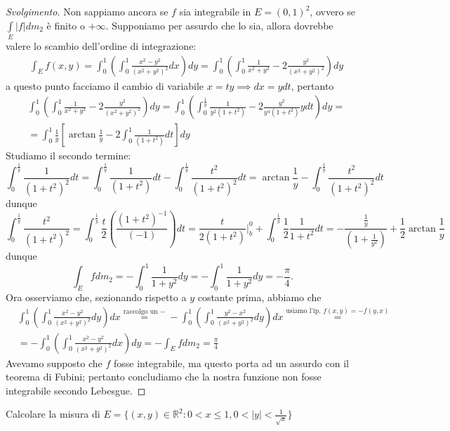 \begin{proof}[Svolgimento]
	Non sappiamo ancora se $f$ sia integrabile in $E = (0,1)^2$, ovvero se $\int\limits_E |f|dm_2$ è finito o $+\infty$. Supponiamo per assurdo che lo sia, allora dovrebbe valere lo scambio dell'ordine di integrazione:
	\begin{align*}
	&\int_E f(x, y) = \int_0^1 \left( \int_0^1 \frac{x^2 - y^2}{(x^2 + y^2)^2} dx \right) dy = \int_0^1 \left( \int_0^1 \frac{1}{x^2+y^2} - 2\frac{y^2}{(x^2 + y^2)^2} \right) dy
	\end{align*}
	a questo punto facciamo il cambio di variabile $x = ty \implies dx = ydt$, pertanto
	\begin{align*}
	&\int_0^1 \left( \int_0^1 \frac{1}{x^2+y^2} - 2\frac{y^2}{(x^2 + y^2)^2} \right) dy = \int_0^1 \left( \int_0^{\frac{1}{y}} \frac{1}{y^2(1+t^2)} - 2\frac{y^2}{y^4(1+t^2)} ydt \right)dy = \\
	&=\int_0^1 \frac{1}{y} \left[ \arctan{\frac{1}{y}} - 2 \int_0^1 \frac{1}{(1+t^2)}dt \right]dy
	\end{align*}
	Studiamo il secondo termine:
	$$
	\int_0^{\frac{1}{y}} \frac{1}{(1+t^2)^2} dt = \int_0^{\frac{1}{y}} \frac{1}{(1+t^2)}dt - \int_0^{\frac{1}{y}} \frac{t^2}{(1+t^2)^2} dt = \arctan{\frac{1}{y}} - \int_0^{\frac{1}{y}} \frac{t^2}{(1+t^2)^2}dt
	$$
	dunque
	$$
	\int_0^{\frac{1}{y}} \frac{t^2}{(1+t^2)^2} = \int_0^{\frac{1}{y}} \frac{t}{2}(\frac{(1+t^2)^{-1}}{(-1)})dt = \frac{t}{2(1+t^2)}|_b^0 + \int_0^{\frac{1}{y}} \frac{1}{2} \frac{1}{1+t^2}dt = -\frac{\frac{1}{y}}{(1+\frac{1}{y^2})} + \frac{1}{2}\arctan{\frac{1}{y}}
	$$
	dunque
	$$
	\int_E fdm_2 = - \int_0^1 \frac{1}{1+y^2}dy = - \int_0^1 \frac{1}{1+y^2}dy = - \frac{\pi}{4}.
	$$
	Ora osserviamo che, sezionando rispetto a $y$ costante prima, abbiamo che
	\begin{align*}
	&\int_0^1 \left( \int_0^1 \frac{x^2-y^2}{(x^2 + y^2)^2}dy \right)dx \stackrel{\text{raccolgo un } -}{=} - \int_0^1 \left( \int_0^1 \frac{y^2 - x^2}{(x^2 + y^2)^2} dy \right)dx \stackrel{\text{usiamo l'ip. } f(x,y)=-f(y,x)}{=} \\
	&= -\int_0^1 \left(\int_0^1 \frac{x^2-y^2}{(x^2 + y^2)^2} dx \right)dy = - \int_E fdm_2 = \frac{\pi}{4} 
	\end{align*}
	Avevamo supposto che $f$ fosse integrabile, ma questo porta ad un assurdo con il teorema di Fubini; pertanto concludiamo che la nostra funzione non fosse integrabile secondo Lebesgue.
\end{proof}
\begin{exercise}
	Calcolare la misura di $E=\{(x, y) \in \mathbb{R}^2: 0 < x \leq 1, 0 < |y| < \frac{1}{\sqrt{x}} \}$
\end{exercise}
